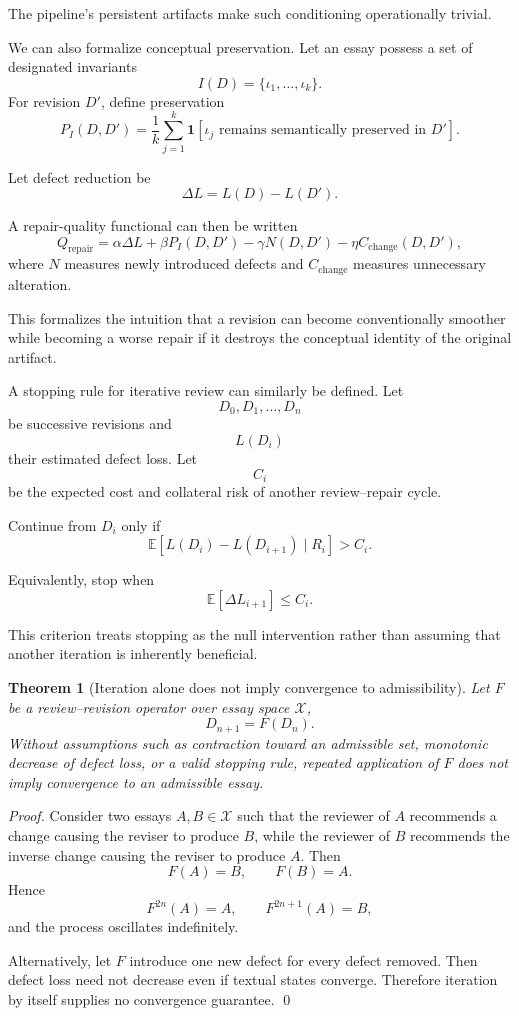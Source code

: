 \documentclass[11pt]{article}
\newtheorem{theorem}[definition]{Theorem}
\begin{document}
The pipeline's persistent artifacts make such conditioning operationally trivial.

We can also formalize conceptual preservation. Let an essay possess a set of designated invariants
\[
    I(D)
    =
    \{\iota_1,\ldots,\iota_k\}.
\]
For revision \(D'\), define preservation
\[
    P_I(D,D')
    =
    \frac{1}{k}
    \sum_{j=1}^{k}
    \mathbf{1}
    \left[
        \iota_j
        \text{ remains semantically preserved in }D'
    \right].
\]

Let defect reduction be
\[
    \Delta L
    =
    L(D)-L(D').
\]

A repair-quality functional can then be written
\[
    Q_{\mathrm{repair}}
    =
    \alpha\Delta L
    +
    \beta P_I(D,D')
    -
    \gamma N(D,D')
    -
    \eta C_{\mathrm{change}}(D,D'),
\]
where \(N\) measures newly introduced defects and \(C_{\mathrm{change}}\) measures unnecessary alteration.

This formalizes the intuition that a revision can become conventionally smoother while becoming a worse repair if it destroys the conceptual identity of the original artifact.

A stopping rule for iterative review can similarly be defined. Let
\[
    D_0,D_1,\ldots,D_n
\]
be successive revisions and
\[
    L(D_i)
\]
their estimated defect loss. Let
\[
    C_i
\]
be the expected cost and collateral risk of another review--repair cycle.

Continue from \(D_i\) only if
\[
    \mathbb{E}
    \left[
        L(D_i)-L(D_{i+1})
        \mid
        R_i
    \right]
    >
    C_i.
\]

Equivalently, stop when
\[
    \mathbb{E}[\Delta L_{i+1}]
    \leq C_i.
\]

This criterion treats stopping as the null intervention rather than assuming that another iteration is inherently beneficial.

\begin{theorem}[Iteration alone does not imply convergence to admissibility]
Let \(F\) be a review--revision operator over essay space \(\mathcal{X}\),
\[
    D_{n+1}=F(D_n).
\]
Without assumptions such as contraction toward an admissible set, monotonic decrease of defect loss, or a valid stopping rule, repeated application of \(F\) does not imply convergence to an admissible essay.
\end{theorem}

\begin{proof}
Consider two essays \(A,B\in\mathcal{X}\) such that the reviewer of \(A\) recommends a change causing the reviser to produce \(B\), while the reviewer of \(B\) recommends the inverse change causing the reviser to produce \(A\). Then
\[
    F(A)=B,
    \qquad
    F(B)=A.
\]
Hence
\[
    F^{2n}(A)=A,
    \qquad
    F^{2n+1}(A)=B,
\]
and the process oscillates indefinitely.

Alternatively, let \(F\) introduce one new defect for every defect removed. Then defect loss need not decrease even if textual states converge. Therefore iteration by itself supplies no convergence guarantee. \qed
\end{proof}
\end{document}
